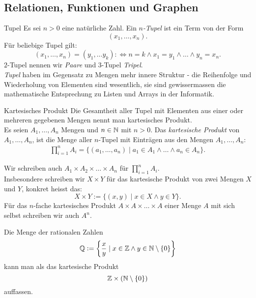 \subsection{Relationen, Funktionen und Graphen}


\begin{definition}{Tupel}
Es sei $n>0$ eine natürliche Zahl. Ein $n$\textit{-Tupel} ist ein Term von der Form
\[
(x_1,\dots,x_n).
\]
Für beliebige Tupel gilt:
\[
(x_1,\dots,x_n)=(y_1,\dots y_k):\Leftrightarrow n=k\land x_1=y_1\land\dots\land y_n=x_n.
\]
$2$-Tupel nennen wir \textit{Paare} und $3$-Tupel \textit{Tripel}.\\
\textit{Tupel} haben im Gegensatz zu Mengen mehr innere Struktur - die Reihenfolge und Wiederholung von Elementen sind wesentlich, sie sind gewissermassen die mathematische Entsprechung zu Listen und Arrays in der Informatik.
\end{definition}



\begin{definition}{Kartesisches Produkt}
Die Gesamtheit aller Tupel mit Elementen aus einer oder mehreren gegebenen Mengen nennt man kartesisches Produkt.\\
Es seien $A_1,\dots, A_n$ Mengen und $n\in\mathbb{N}$ mit $n>0$.
Das \textit{kartesische Produkt} von $A_1,\dots, A_n$, ist die Menge aller $n$-Tupel mit Einträgen aus den Mengen $A_1,\dots ,A_n$:
\begin{align*}
\prod_{i=1}^{n}A_i=\big\{(a_1,\dots,a_n)\mid a_1\in A_1\land\dots\land a_n\in A_n \big\}.
\end{align*}
\end{definition}

\begin{remark}
    Wir schreiben auch $A_1\times A_2\times \dots\times A_n$ für $\prod_{i=1}^nA_i$.\\ Insbesondere schreiben wir $X\times Y$ für das kartesische Produkt von zwei Mengen $X$ und $Y$, konkret heisst das:
    \[
    X\times Y:=\{(x,y)\mid x\in X\land y\in Y \}.
    \]
    Für das $n$-fache kartesisches Produkt $A\times A\times\dots\times A$ einer Menge $A$ mit sich selbst schreiben wir auch $A^n$.
    \end{remark}

    \begin{example}
        Die Menge der rationalen Zahlen
        \[
        \mathbb{Q}:=\left\{\frac{x}{y}\mid x\in \mathbb{Z}\land y\in\mathbb{N}\setminus\{0\}\right\}
        \]
        kann man als das kartesische Produkt
        \[
        \mathbb{Z}\times(\mathbb{N}\setminus\{0\})
        \]
        auffassen.
    \end{example}

